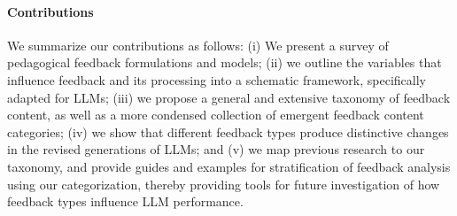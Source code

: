 \paragraph{Contributions} We summarize our contributions as follows:
(i) We present a survey of pedagogical feedback formulations and models;
(ii) we outline the variables that influence feedback and its processing into a schematic framework, specifically adapted for LLMs;
(iii) we propose a general and extensive taxonomy of feedback content, as well as a more condensed collection of emergent feedback content categories;
(iv) we show that different feedback types produce distinctive changes in the revised generations of LLMs; and (v) we map previous research to our taxonomy, and provide guides and examples for stratification of feedback analysis using our categorization, thereby providing tools for future investigation of how feedback types influence LLM performance.
 


